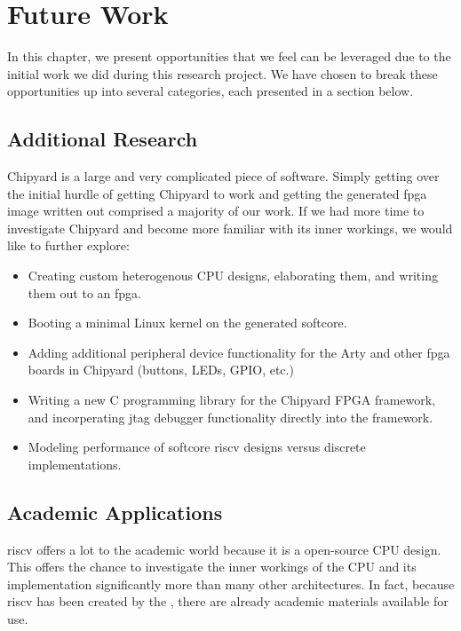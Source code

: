 \chapter{Future Work}\label{chap:Future_Work}
In this chapter, we present opportunities that we feel can be leveraged due to the initial work we did during this research project.
We have chosen to break these opportunities up into several categories, each presented in a section below.

\section{Additional Research}\label{sec:Additional_Research}
Chipyard is a large and very complicated piece of software.
Simply getting over the initial hurdle of getting Chipyard to work and getting the generated \Gls{fpga} image written out comprised a majority of our work.
If we had more time to investigate Chipyard and become more familiar with its inner workings, we would like to further explore:
\begin{itemize}
\item Creating custom heterogenous CPU designs, elaborating them, and writing them out to an \Gls{fpga}.
\item Booting a minimal Linux kernel on the generated \gls{softcore}.

\item Adding additional peripheral device functionality for the Arty and other \Gls{fpga} boards in Chipyard (buttons, LEDs, GPIO, etc.)

\item Writing a new C programming library for the Chipyard FPGA framework, and incorperating \Gls{jtag} debugger functionality directly into the framework.

\item Modeling performance of \gls{softcore} \Gls{riscv} designs versus discrete implementations.
\end{itemize}

\section{Academic Applications}\label{sec:Academic_Applications}
\Gls{riscv} offers a lot to the academic world because it is a open-source CPU design.
This offers the chance to investigate the inner workings of the CPU and its implementation significantly more than many other architectures.
In fact, because \Gls{riscv} has been created by the \UCB{}, there are already academic materials available for use.

